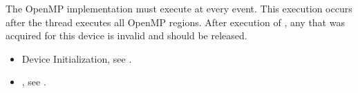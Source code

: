 \descr
The OpenMP implementation must execute  
at every  event. This execution occurs after 
the thread executes all OpenMP regions. After execution of 
, any  that 
was acquired for this device is invalid and should be released.

\crossreferences
\begin{itemize}
\item Device Initialization, see .

\item {}, 
see .
\end{itemize}

